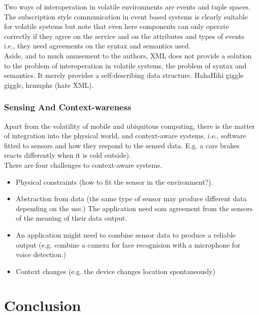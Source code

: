 Two ways of interoperation in volatile environments are events and tuple spaces. The subscription style communication in event based systems is clearly suitable for volatile systems but note that even here components can only operate correctly if they agree on the service and on the attributes and types of events i.e., they need agreements on the syntax and semantics used.\\ 


Aside, and to much amusement to the authors, XML does not provide a solution to the problem of interoperation in volatile systems, the problem of syntax and semantics. It merely provides a self-describing data structure. HahaHihi giggle giggle, hrmuphs (hate XML).\\

\subsubsection{Sensing And Context-wareness}

Apart from the volatility of mobile and ubiquitous computing, there is the matter of integration into the physical world, and context-aware systems. i.e., software fitted to sensors and how they respond to the sensed data. E.g. a cars brakes reacts differently when it is cold outside).\\ 

There are four challenges to context-aware systems. 

\begin{itemize}
\item Physical constraints (how to fit the sensor in the environment?). 
\item Abstraction from data (the same type of sensor may produce different data depending on the use.)  The application need som agreement from the sensors of the meaning of their data output. 
\item An application might need to combine sensor data to produce a reliable output (e.g. combine a camera  for face recognision with a microphone for voice detection.) 
\item Context changes (e.g. the device changes location spontaneously)
\end{itemize}



 




\section{Conclusion}
